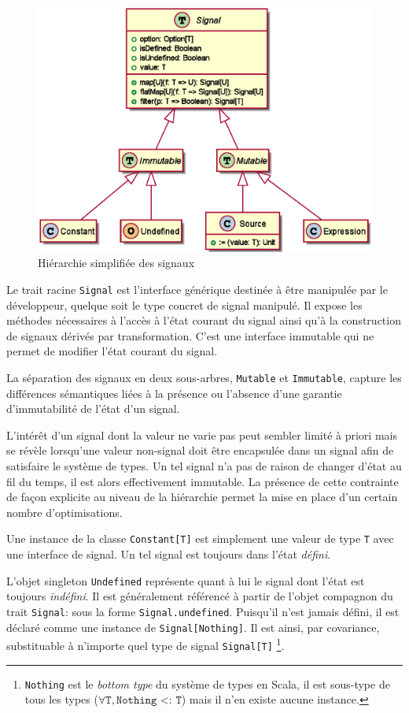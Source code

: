 \begin{figure}[!h]
	\centering
	\includegraphics[width=12cm]{img/signals_simple}
	\caption{Hiérarchie simplifiée des signaux}
	\label{fig:sig-simple-hierarchy}	
\end{figure}

Le trait racine \texttt{Signal} est l'interface générique destinée à être manipulée par le développeur, quelque soit le type concret de signal manipulé. Il expose les méthodes nécessaires à l'accès à l'état courant du signal ainsi qu'à la construction de signaux dérivés par transformation. C'est une interface immutable qui ne permet de modifier l'état courant du signal.

La séparation des signaux en deux sous-arbres, \texttt{Mutable} et \texttt{Immutable}, capture les différences sémantiques liées à la présence ou l'absence d'une garantie d'immutabilité de l'état d'un signal.

L'intérêt d'un signal dont la valeur ne varie pas peut sembler limité à priori mais se révèle lorsqu'une valeur non-signal doit être encapsulée dans un signal afin de satisfaire le système de types. Un tel signal n'a pas de raison de changer d'état au fil du temps, il est alors effectivement immutable. La présence de cette contrainte de façon explicite au niveau de la hiérarchie permet la mise en place d'un certain nombre d'optimisations.

Une instance de la classe \texttt{Constant[T]} est simplement une valeur de type \texttt{T} avec une interface de signal. Un tel signal est toujours dans l'état \emph{défini}.

L'objet singleton \texttt{Undefined} représente quant à lui le signal dont l'état est toujours \emph{indéfini}. Il est généralement référencé à partir de l'objet compagnon du trait \texttt{Signal}: sous la forme \texttt{Signal.undefined}. Puisqu'il n'est jamais défini, il est déclaré comme une instance de \texttt{Signal[Nothing]}. Il est ainsi, par covariance, substituable à n'importe quel type de signal \texttt{Signal[T]} \footnote{\texttt{Nothing} est le \emph{bottom type} du système de types en Scala, il est sous-type de tous les types ($\forall \texttt{T}, \texttt{Nothing <: T}$) mais il n'en existe aucune instance.}.

